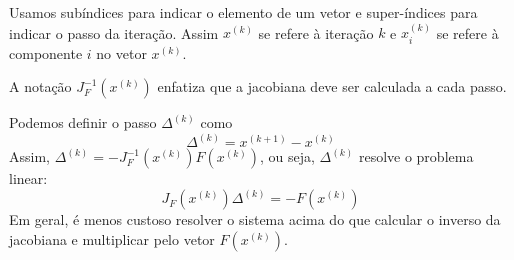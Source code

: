 \documentclass[main.tex]{subfiles}
\begin{document}
\begin{obs} Usamos subíndices para indicar o elemento de um vetor e super-índices para indicar o passo da iteração. Assim $x^{(k)}$ se refere à iteração $k$ e $x_i^{(k)}$ se refere à componente $i$ no vetor $x^{(k)}$.
\end{obs}
\begin{obs} A notação $J_F^{-1}\left(x^{(k)}\right)$ enfatiza que a jacobiana deve ser calculada a cada passo.
\end{obs}
\begin{obs} Podemos definir o passo $\Delta^{(k)}$ como
$$\Delta^{(k)}= x^{(k+1)}-x^{(k)}$$
Assim, $\Delta^{(k)}=-J_F^{-1}\left(x^{(k)}\right)F(x^{(k)})$, ou seja, $\Delta^{(k)}$ resolve o problema linear:
$$J_F\left(x^{(k)}\right)\Delta^{(k)}= - F(x^{(k)})$$
Em geral, é menos custoso resolver o sistema acima do que calcular o inverso da jacobiana e multiplicar pelo vetor $F(x^{(k)})$.
\end{obs}
\end{document}
